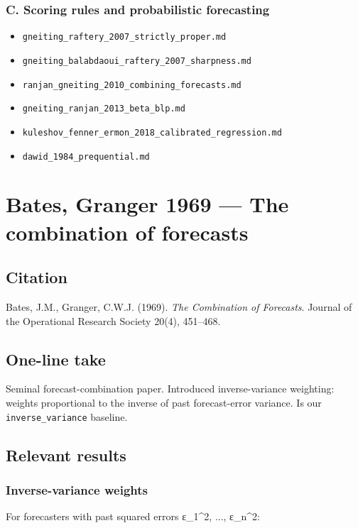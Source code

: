 \documentclass[11pt,a4paper,openany]{report}
\begin{document}
\subsection{C. Scoring rules and probabilistic forecasting}
\begin{itemize}
  \item \texttt{gneiting\_raftery\_2007\_strictly\_proper.md}
  \item \texttt{gneiting\_balabdaoui\_raftery\_2007\_sharpness.md}
  \item \texttt{ranjan\_gneiting\_2010\_combining\_forecasts.md}
  \item \texttt{gneiting\_ranjan\_2013\_beta\_blp.md}
  \item \texttt{kuleshov\_fenner\_ermon\_2018\_calibrated\_regression.md}
  \item \texttt{dawid\_1984\_prequential.md}
\end{itemize}
\chapter{Bates, Granger 1969 — The combination of forecasts}

\section{Citation}

Bates, J.M., Granger, C.W.J. (1969). \emph{The Combination of Forecasts}.
Journal of the Operational Research Society 20(4), 451–468.

\section{One-line take}

Seminal forecast-combination paper. Introduced inverse-variance
weighting: weights proportional to the inverse of past forecast-error
variance. Is our \texttt{inverse\_variance} baseline.

\section{Relevant results}

\subsection{Inverse-variance weights}

For forecasters with past squared errors ε\_1\textasciicircum{}2, ..., ε\_n\textasciicircum{}2:
\end{document}
